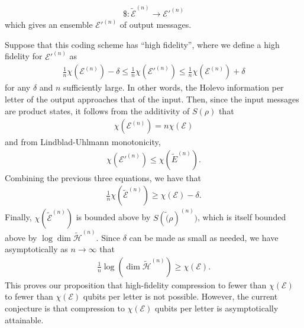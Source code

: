 \documentclass[a4paper, 12pt]{article}
\numberwithin{equation}{section}
\numberwithin{figure}{section}
\theoremstyle{definition}
\begin{document}
    \begin{align}
        \$ : \tilde{\mathcal{E}}^{(n)} \to \mathcal{E}'^{(n)}
    \end{align}
    which gives an ensemble $\mathcal{E}'^{(n)}$ of output messages. \par
    Suppose that this coding scheme has ``high fidelity'', where we define a high fidelity for $\mathcal{E}'^{(n)}$ as
    \begin{align}
        \frac{1}{n} \chi(\mathcal{E}^{(n)}) - \delta \leq \frac{1}{n} \chi(\mathcal{E}'^{(n)}) \leq \frac{1}{n} \chi(\mathcal{E}^{(n)}) + \delta
    \end{align}
    for any $\delta$ and $n$ sufficiently large. In other words, the Holevo information per letter of the output approaches that of the input. Then, since the input messages are product states, it follows from the additivity of $S(\rho)$ that
    \begin{align}
        \chi(\mathcal{E}^{(n)}) = n \chi(\mathcal{E})
    \end{align}
    and from Lindblad-Uhlmann monotonicity,
    \begin{align}
        \chi(\mathcal{E}'^{(n)}) \leq \chi(\tilde{E}^{(n)}).
    \end{align}
    Combining the previous three equations, we have that
    \begin{align}
        \frac{1}{n} \chi(\tilde{\mathcal{E}}^{(n)}) \geq \chi(\mathcal{E}) - \delta.
    \end{align}
    Finally, $\chi(\tilde{\mathcal{E}}^{(n)})$ is bounded above by $S(\tilde(\rho)^{(n)})$, which is itself bounded above by $\log \dim \tilde{\mathcal{H}}^{(n)}$. Since $\delta$ can be made as small as needed, we have asymptotically as $n \to \infty$ that
    \begin{align}
        \frac{1}{n} \log(\dim \tilde{\mathcal{H}}^{(n)}) \geq \chi(\mathcal{E}).
    \end{align}
    This proves our proposition that high-fidelity compression to fewer than $\chi(\mathcal{E})$ to fewer than $\chi(\mathcal{E})$ qubits per letter is not possible. However, the current conjecture is that compression to $\chi(\mathcal{E})$ qubits per letter is asymptotically attainable. \par

\end{document}
